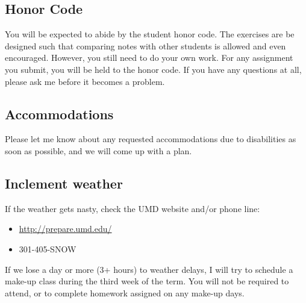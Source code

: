 \documentclass{tufte-handout}
\begin{document}
\subsection*{Honor Code}
\label{sec-8-1}

You will be expected to abide by the student honor code. The exercises are be designed such that comparing notes with other students is allowed and even encouraged.  However, you still need to do your own work.  For any assignment you submit, you will be held to the honor code. If you have any questions at all, please ask me before it becomes a problem.
\subsection*{Accommodations}
\label{sec-8-2}

Please let me know about any requested accommodations due to disabilities as soon as possible, and we will come up with a plan.
\subsection*{Inclement weather}
\label{sec-8-3}

If the weather gets nasty, check the UMD website and/or phone line:
\begin{itemize}
\item \href{http://prepare.umd.edu/}{http://prepare.umd.edu/}
\item 301-405-SNOW
\end{itemize}

If we lose a day or more (3+ hours) to weather delays, I will try to schedule a make-up class during the third week of the term. You will not be required to attend, or to complete homework assigned on any make-up days.
\end{document}
